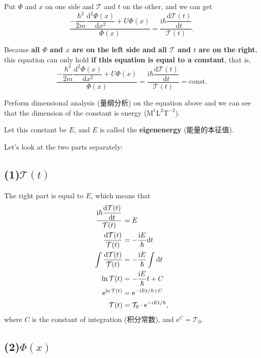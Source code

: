 Put \(\Phi\) and \(x\) on one side and \(\mathcal{T}\) and \(t\) on the other, and we can get \[\dfrac{-\dfrac{ \hbar^2 }{2m}\dfrac{\mathrm d^2 \Phi(x)}{\mathrm d x ^2 } + U \Phi(x) }{\Phi(x)} = \dfrac{\mathrm i\hbar \dfrac{\mathrm d \mathcal{T}(t) }{\mathrm d t}}{\mathcal{T}(t)}.\]

Because \textbf{all \(\Phi\) and \(x\) are on the left side and all \(\mathcal{T}\) and \(t\) are on the right}, this equation can only hold \textbf{if this equation is equal to a constant}, that is, \[\dfrac{-\dfrac{ \hbar^2 }{2m}\dfrac{\mathrm d^2 \Phi(x)}{\mathrm d x ^2 } + U \Phi(x) }{\Phi(x)} = \dfrac{\mathrm i\hbar \dfrac{\mathrm d \mathcal{T}(t) }{\mathrm d t}}{\mathcal{T}(t)}=\mathrm{const}.\]

Perform dimensional analysis (量纲分析) on the equation above and we can see that the dimension of the constant is energy (\(\mathrm{M^1L^2T^{-2}}\)).

Let this constant be \(E\), and \(E\) is called the \textbf{eigenenergy} (能量的本征值).

Let's look at the two parts separately:

\subsection*{(1)\({\mathcal{T}(t)}\)}\label{mathcaltt}

The right part is equal to \(E\), which means that \begin{align*}
    \dfrac{\mathrm i\hbar \dfrac{\mathrm d \mathcal{T}(t) }{\mathrm d t}}{\mathcal{T}(t)} & =E \\
    \dfrac{\mathrm d \mathcal{T}(t) }{\mathcal{T}(t)} & = -{\mathrm iE \over \hbar}\mathrm dt \\
    \int {\dfrac{\mathrm d \mathcal{T}(t) }{\mathcal{T}(t)}} & = -{\mathrm iE \over \hbar} \int {\mathrm dt} \\
    \ln \mathcal{T}(t) & = -{\mathrm iE \over \hbar} t +C \\
    \mathrm e^{\ln \mathcal{T}(t)} & = \mathrm e^{- \mathrm iEt / \hbar +C} \\
    \mathcal{T}(t) & = \mathcal{T}_0 \cdot \mathrm e^{- \mathrm iEt / \hbar},
\end{align*} where \(C\) is the constant of integration (积分常数), and \(\mathrm e^C = \mathcal{T}_0\).

\subsection*{(2)\(\Phi(x)\)}\label{phix}

